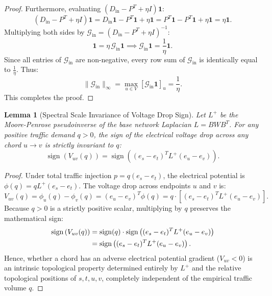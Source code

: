 \documentclass[11pt,a4paper]{article}
\newtheorem{lemma}{Lemma}
\begin{document}
\begin{proof}
Furthermore, evaluating $(D_{\text{in}} - P^T + \eta I) \mathbf{1}$:
\begin{equation}
(D_{\text{in}} - P^T + \eta I) \mathbf{1} = D_{\text{in}} \mathbf{1} - P^T \mathbf{1} + \eta \mathbf{1} = P^T \mathbf{1} - P^T \mathbf{1} + \eta \mathbf{1} = \eta \mathbf{1}.
\end{equation}
Multiplying both sides by $\mathcal{G}_{\text{in}} = (D_{\text{in}} - P^T + \eta I)^{-1}$:
\begin{equation}
\mathbf{1} = \eta \, \mathcal{G}_{\text{in}} \mathbf{1} \implies \mathcal{G}_{\text{in}} \mathbf{1} = \frac{1}{\eta} \mathbf{1}.
\end{equation}
Since all entries of $\mathcal{G}_{\text{in}}$ are non-negative, every row sum of $\mathcal{G}_{\text{in}}$ is identically equal to $\frac{1}{\eta}$. Thus:
\begin{equation}
\|\mathcal{G}_{\text{in}}\|_\infty = \max_{u \in V} [\mathcal{G}_{\text{in}} \mathbf{1}]_u = \frac{1}{\eta}.
\end{equation}
This completes the proof.
\end{proof}

\begin{lemma}[Spectral Scale Invariance of Voltage Drop Sign]
\label{lem:scale_invariance}
Let $L^+$ be the Moore-Penrose pseudoinverse of the base network Laplacian $L = B W B^T$. For any positive traffic demand $q > 0$, the sign of the electrical voltage drop across any chord $u \to v$ is strictly invariant to $q$:
\begin{equation}
\operatorname{sign}\left( V_{uv}(q) \right) = \operatorname{sign}\left( (e_s - e_t)^T L^+ (e_u - e_v) \right).
\end{equation}
\end{lemma}

\begin{proof}
Under total traffic injection $p = q (e_s - e_t)$, the electrical potential is $\phi(q) = q L^+ (e_s - e_t)$. The voltage drop across endpoints $u$ and $v$ is:
\begin{equation}
V_{uv}(q) = \phi_u(q) - \phi_v(q) = (e_u - e_v)^T \phi(q) = q \cdot \left[ (e_s - e_t)^T L^+ (e_u - e_v) \right].
\end{equation}
Because $q > 0$ is a strictly positive scalar, multiplying by $q$ preserves the mathematical sign:
\begin{align}
\operatorname{sign}\left( V_{uv}(q) \right) &= \operatorname{sign}(q) \cdot \operatorname{sign}\left( (e_s - e_t)^T L^+ (e_u - e_v) \right) \notag \\
&= \operatorname{sign}\left( (e_s - e_t)^T L^+ (e_u - e_v) \right).
\end{align}
Hence, whether a chord has an adverse electrical potential gradient ($V_{uv} < 0$) is an intrinsic topological property determined entirely by $L^+$ and the relative topological positions of $s, t, u, v$, completely independent of the empirical traffic volume $q$.
\end{proof}
\end{document}
